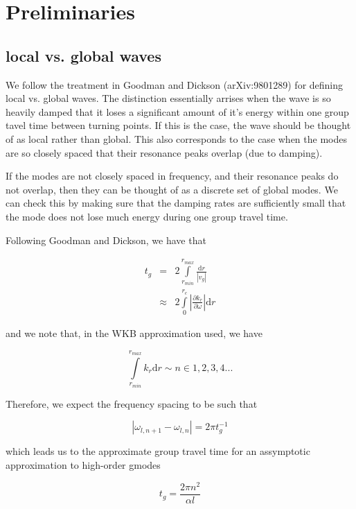 \section*{Preliminaries}

\subsection*{local vs. global waves}

We follow the treatment in Goodman and Dickson (arXiv:9801289) for defining local vs. global waves. The distinction essentially arrises when the wave is so heavily damped that it loses a significant amount of it's energy within one group tavel time between turning points. If this is the case, the wave should be thought of as local rather than global. This also corresponds to the case when the modes are so closely spaced that their resonance peaks overlap (due to damping).

If the modes are not closely spaced in frequency, and their resonance peaks do not overlap, then they can be thought of as a discrete set of global modes. We can check this by making sure that the damping rates are sufficiently small that the mode does not lose much energy during one group travel time.

Following Goodman and Dickson, we have that 

\begin{eqnarray}
t_g & = & 2 \int\limits_{r_{min}}^{r_{max}} \frac{\mathrm{d}r}{|v_g|} \\
& \approx & 2 \int\limits_{0}^{r_c} \left|\frac{\partial k_r}{\partial \omega}\right| \mathrm{d}r
\end{eqnarray}

and we note that, in the WKB approximation used, we have 

\begin{equation}
\int\limits_{r_{min}}^{r_{max}} k_r \mathrm{d}r \sim n \in 1,2,3,4...
\end{equation}

Therefore, we expect the frequency spacing to be such that 

\begin{equation}
\left|\omega_{l,n+1} - \omega_{l,n}\right| = 2\pi t_g^{-1}
\end{equation}

which leads us to the approximate group travel time for an assymptotic approximation to high-order gmodes

\begin{equation}
t_g = \frac{2\pi n^2}{\alpha l}
\end{equation}

